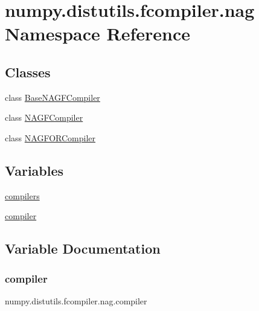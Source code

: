 \hypertarget{namespacenumpy_1_1distutils_1_1fcompiler_1_1nag}{}\section{numpy.\+distutils.\+fcompiler.\+nag Namespace Reference}
\label{namespacenumpy_1_1distutils_1_1fcompiler_1_1nag}
\subsection*{Classes}
\begin{DoxyCompactItemize}
\item 
class \hyperlink{classnumpy_1_1distutils_1_1fcompiler_1_1nag_1_1BaseNAGFCompiler}{Base\+N\+A\+G\+F\+Compiler}
\item 
class \hyperlink{classnumpy_1_1distutils_1_1fcompiler_1_1nag_1_1NAGFCompiler}{N\+A\+G\+F\+Compiler}
\item 
class \hyperlink{classnumpy_1_1distutils_1_1fcompiler_1_1nag_1_1NAGFORCompiler}{N\+A\+G\+F\+O\+R\+Compiler}
\end{DoxyCompactItemize}
\subsection*{Variables}
\begin{DoxyCompactItemize}
\item 
\hyperlink{namespacenumpy_1_1distutils_1_1fcompiler_1_1nag_a3b49568b5ad2471a8328341c8defaabe}{compilers}
\item 
\hyperlink{namespacenumpy_1_1distutils_1_1fcompiler_1_1nag_a3e538885a7671bc818f42b5fd20505d1}{compiler}
\end{DoxyCompactItemize}


\subsection{Variable Documentation}
\mbox{\label{namespacenumpy_1_1distutils_1_1fcompiler_1_1nag_a3e538885a7671bc818f42b5fd20505d1}} 
\subsubsection{\texorpdfstring{compiler}{compiler}}
{\footnotesize\ttfamily numpy.\+distutils.\+fcompiler.\+nag.\+compiler}

